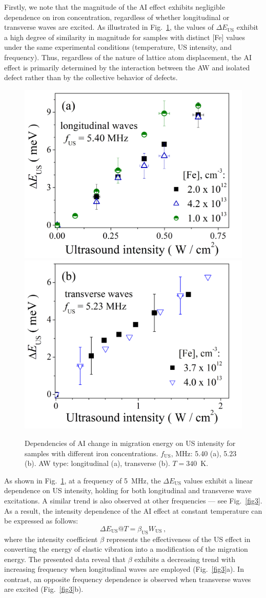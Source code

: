 \documentclass{ttp}
\begin{document}
Firstly, we note that the magnitude of the AI effect exhibits negligible dependence 
on iron concentration, regardless of whether longitudinal or transverse waves are excited.
As illustrated in Fig.~\ref{fig2}, the values of $\Delta E_\mathrm{US}$ exhibit a high degree of similarity 
in magnitude for samples with distinct [Fe] values under the same experimental conditions 
(temperature, US intensity, and frequency).
Thus, regardless of the nature of lattice atom displacement, 
the AI effect is primarily determined by the interaction between the AW and isolated defect 
rather than by the collective behavior of defects.

\begin{figure}
	\centering
     \includegraphics[width=0.4\linewidth]{Fig2a.png}
     \includegraphics[width=0.4\linewidth]{Fig2b.png}
	  \caption{Dependencies of AI change in migration energy on US intensity for
       samples with different  iron concentrations.
       $f_\mathrm{US}$, MHz: 5.40 (a), 5.23 (b).
       AW type: longitudinal (a), transverse (b).
       $T=340$~K.
}\label{fig2}
\end{figure}

As shown in Fig.~\ref{fig2}, at a frequency of 5~MHz,  
the $\Delta E_\mathrm{US}$ values exhibit a linear dependence on US intensity, 
holding for both longitudinal and transverse wave excitations.
A similar trend is also observed at other frequencies --- see Fig.~\ref{fig3}.
As a result, the intensity dependence of the AI effect at constant temperature can be expressed as follows:
\begin{equation}\label{eq3O}
  \Delta E_\mathrm{US}@ T = \beta_\mathrm{US} W_\mathrm{US}\,,
\end{equation}
where 
the intensity coefficient $\beta$ represents the effectiveness of the US effect 
in converting the energy of elastic vibration into a modification of the migration energy.
The presented data reveal that $\beta$ exhibits a decreasing trend 
with increasing frequency when longitudinal waves are employed (Fig.~\ref{fig3}a).
In contrast, an opposite frequency dependence is observed when transverse waves are excited (Fig.~\ref{fig3}b).
\end{document}

